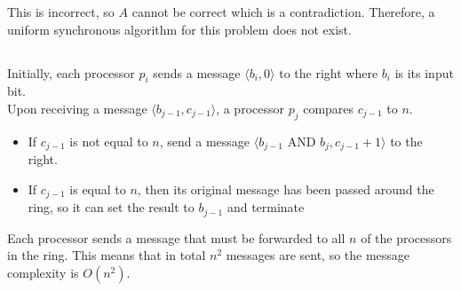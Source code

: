\documentclass[11pt]{article}
\begin{document}
This is incorrect, so $A$ cannot be correct which is a contradiction. Therefore, a uniform synchronous algorithm for this problem does not exist. 


\subsection{}


%
%

%

Initially, each processor $p_i$ sends a message $\langle b_i, 0 \rangle$ to the right where $b_i$ is its input bit.\\
Upon receiving a message $\langle b_{j-1}, c_{j-1} \rangle$, a processor $p_j$ compares $c_{j-1}$ to $n$.
\begin{itemize}
\item If $c_{j-1}$ is not equal to $n$, send a message $\langle b_{j-1} \text{ AND } b_j, c_{j-1} + 1 \rangle$ to the right.
\item If $c_{j-1}$ is equal to $n$, then its original message has been passed around the ring, so it can set the result to $b_{j-1}$ and terminate
\end{itemize}
Each processor sends a message that must be forwarded to all $n$ of the processors in the ring. This means that in total $n^2$ messages are sent, so the message complexity is $O(n^2)$.
\end{document}
